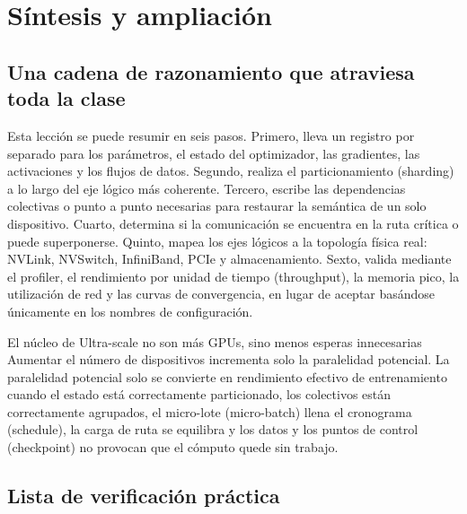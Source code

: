 \section{Síntesis y ampliación}

\subsection{Una cadena de razonamiento que atraviesa toda la clase}

Esta lección se puede resumir en seis pasos. Primero, lleva un registro por separado para los parámetros, el estado del optimizador, las gradientes, las activaciones y los flujos de datos. Segundo, realiza el particionamiento (sharding) a lo largo del eje lógico más coherente. Tercero, escribe las dependencias colectivas o punto a punto necesarias para restaurar la semántica de un solo dispositivo. Cuarto, determina si la comunicación se encuentra en la ruta crítica o puede superponerse. Quinto, mapea los ejes lógicos a la topología física real: NVLink, NVSwitch, InfiniBand, PCIe y almacenamiento. Sexto, valida mediante el profiler, el rendimiento por unidad de tiempo (throughput), la memoria pico, la utilización de red y las curvas de convergencia, en lugar de aceptar basándose únicamente en los nombres de configuración.

\begin{importantbox}{El núcleo de Ultra-scale no son más GPUs, sino menos esperas innecesarias}
Aumentar el número de dispositivos incrementa solo la paralelidad potencial. La paralelidad potencial solo se convierte en rendimiento efectivo de entrenamiento cuando el estado está correctamente particionado, los colectivos están correctamente agrupados, el micro-lote (micro-batch) llena el cronograma (schedule), la carga de ruta se equilibra y los datos y los puntos de control (checkpoint) no provocan que el cómputo quede sin trabajo.
\end{importantbox}

\subsection{Lista de verificación práctica}

